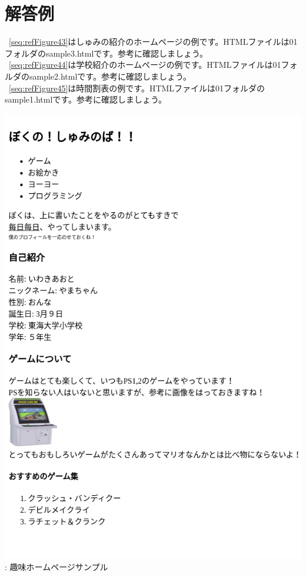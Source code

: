 \documentclass[a4paper,12pt]{jarticle}
\begin{document}
\section{解答例}
 {~\ref{seq:refFigure43}はしゅみの紹介のホームページの例です。HTMLファイルは01フォルダのsample3.htmlです。参考に確認しましょう。}\\
{~\ref{seq:refFigure44}は学校紹介のホームページの例です。HTMLファイルは01フォルダのsample2.htmlです。参考に確認しましょう。}\\
{~\ref{seq:refFigure45}は時間割表の例です。HTMLファイルは01フォルダのsample1.htmlです。参考に確認しましょう。}\\

\centering
\begin{minipage}{0.45\textwidth}
  {\upshape
    \includegraphics[width=0.9\linewidth]{textbook-img209.png}
    \newline
    {\theFigure\label{seq:refFigure43}}:
    趣味ホームページサンプル}
\end{minipage}
\end{document}
